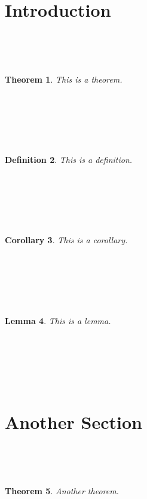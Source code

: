 \documentclass{article}
\newtheorem{theorem}{Theorem}[section] %
\newtheorem{definition}[theorem]{Definition} %
\newtheorem{corollary}[theorem]{Corollary} %
\newtheorem{lemma}[theorem]{Lemma} %
\begin{document}
​

​\section{Introduction}

​

​\begin{theorem}

​​This is a theorem.

​\end{theorem}

​

​\begin{definition}

​​This is a definition.

​\end{definition}

​

​\begin{corollary}

​​This is a corollary.

​\end{corollary}

​

​\begin{lemma}

​​This is a lemma.

​\end{lemma}

​

​\section{Another Section}

​

​\begin{theorem}

​​Another theorem.

​\end{theorem}

​
\end{document}

